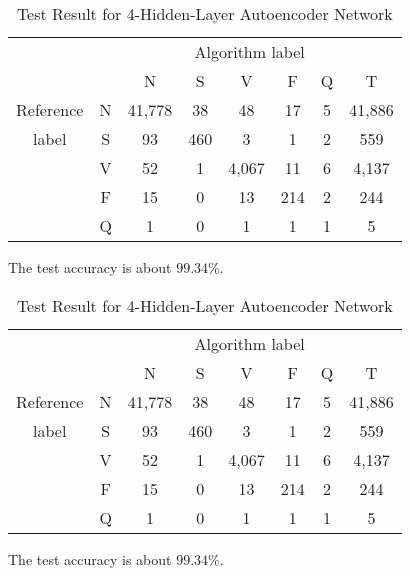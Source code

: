 \documentclass[journal]{IEEEtran}
\begin{document}
\begin{table}[!htbp]
\begin{center}
\begin{threeparttable}
\caption{Test Result for 4-Hidden-Layer Autoencoder Network}
\label{table7}
\begin{tabular}{cccccccc}
\hline
\multicolumn{6}{r}{Algorithm label} \\
\cline{3-7}
		&  & N & S      & V    & F     & Q   & T\\
\hline
 Reference & N & 41,778 &  38  &  48   & 17  & 5  &  41,886 \\
	label  & S &  93    & 460  &   3   & 1   & 2  &  559\\
		   & V &  52    & 1    & 4,067 & 11  & 6  &  4,137\\
		   & F &  15    & 0    & 13    & 214 & 2  &  244\\
		   & Q &  1     & 0    & 1     & 1   & 1  &  5\\
\hline
\end{tabular}
\begin{tablenotes}
\item The test accuracy is about $99.34\%$.
\end{tablenotes}
\end{threeparttable}
\end{center}
\end{table}

\lipsum[1]

\begin{table}[!htbp]
\begin{center}
\begin{threeparttable}
\caption{Test Result for 4-Hidden-Layer Autoencoder Network}
\label{table7}
\begin{tabular}{cccccccc}
\hline
\multicolumn{6}{r}{Algorithm label} \\
\cline{3-7}
		&  & N & S      & V    & F     & Q   & T\\
\hline
 Reference & N & 41,778 &  38  &  48   & 17  & 5  &  41,886 \\
	label  & S &  93    & 460  &   3   & 1   & 2  &  559\\
		   & V &  52    & 1    & 4,067 & 11  & 6  &  4,137\\
		   & F &  15    & 0    & 13    & 214 & 2  &  244\\
		   & Q &  1     & 0    & 1     & 1   & 1  &  5\\
\hline
\end{tabular}
\begin{tablenotes}
\item The test accuracy is about $99.34\%$.
\end{tablenotes}
\end{threeparttable}
\end{center}
\end{table}
\end{document}
